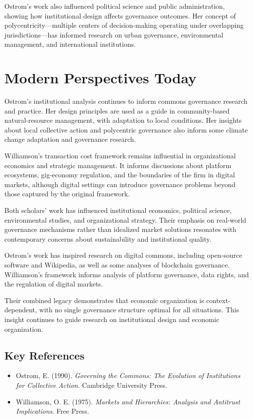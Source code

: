 Ostrom's work also influenced political science and public administration,
showing how institutional design affects governance outcomes. Her concept of
polycentricity---multiple centers of decision-making operating under overlapping
jurisdictions---has informed research on urban governance, environmental
management, and international institutions.

\section{Modern Perspectives Today}
Ostrom's institutional analysis continues to inform commons governance research
and practice. Her design principles are used as a guide in community-based
natural-resource management, with adaptation to local conditions. Her insights
about local collective action and polycentric governance also inform some climate
change adaptation and governance research.

Williamson's transaction cost framework remains influential in organizational
economics and strategic management. It informs discussions about platform
ecosystems, gig-economy regulation, and the boundaries of the firm in digital
markets, although digital settings can introduce governance problems beyond those
captured by the original framework.

Both scholars' work has influenced institutional economics, political science,
environmental studies, and organizational strategy. Their emphasis on real-world
governance mechanisms rather than idealized market solutions resonates with
contemporary concerns about sustainability and institutional quality.

Ostrom's work has inspired research on digital commons, including open-source
software and Wikipedia, as well as some analyses of blockchain governance.
Williamson's framework informs analysis of platform governance, data rights, and
the regulation of digital markets.

Their combined legacy demonstrates that economic organization is context-dependent,
with no single governance structure optimal for all situations. This insight
continues to guide research on institutional design and economic organization.

\subsection*{Key References}
\begin{itemize}
    \item Ostrom, E. (1990). \textit{Governing the Commons: The Evolution of Institutions for Collective Action}. Cambridge University Press.
    \item Williamson, O. E. (1975). \textit{Markets and Hierarchies: Analysis and Antitrust Implications}. Free Press.
\end{itemize}
